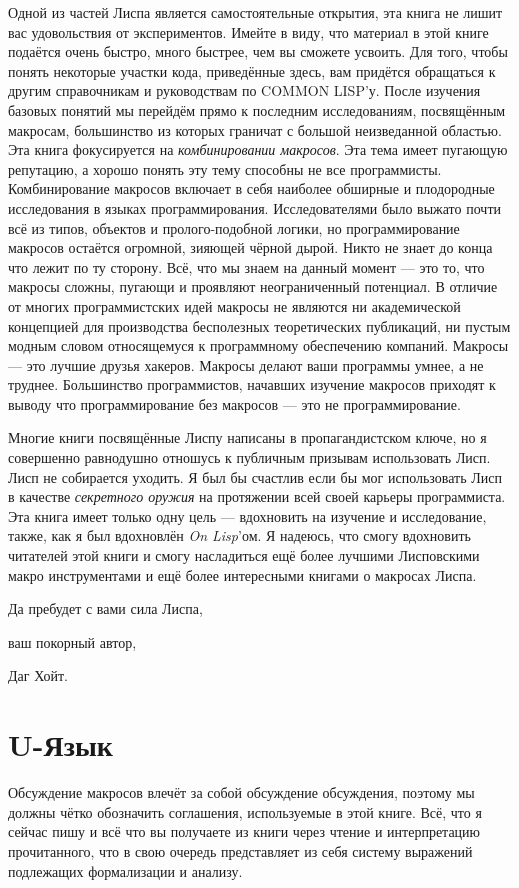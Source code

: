 Одной из частей Лиспа является самостоятельные открытия, эта кни\-га не лишит вас удовольствия от экспериментов. Имейте в виду, что материал в этой книге подаётся очень быстро, много быстрее, чем вы сможете усвоить. Для того, чтобы понять некоторые участки кода, приведённые здесь, вам придётся обращаться к другим справочникам и руководствам по COMMON LISP'у. После изучения базовых понятий мы перейдём прямо к последним исследованиям, посвящённым макросам, большинство из которых граничат с большой неизведанной областью. Эта книга фокусируется на \emph{комбинировании макросов}. Эта тема имеет пугающую репутацию, а хорошо понять эту тему способны не все прог\-рам\-мисты. Комбинирование макросов включает в себя наиболее об\-шир\-ные и плодородные исследования в языках программирования. Ис\-сле\-до\-ва\-те\-лями было выжато почти всё из типов, объектов и пролого-подобной логики, но программирование макросов остаётся огромной, зияющей чёрной дырой. Никто не знает до конца что лежит по ту сторону. Всё, что мы знаем на данный момент --- это то, что макросы сложны, пугающи и проявляют неограниченный потенциал. В отличие от многих программистских идей макросы не являются ни ака\-де\-ми\-ческой концепцией для производства бесполезных теоретических пуб\-ли\-каций, ни пустым модным словом относящемуся к программному обес\-пе\-че\-нию компаний. Макросы --- это лучшие друзья хакеров. Макросы делают ваши программы умнее, а не труднее. Большинство прог\-рам\-мис\-тов, начавших изучение макросов приходят к выводу что прог\-рам\-ми\-ро\-ва\-ние без макросов --- это не программирование.

Многие книги посвящённые Лиспу написаны в пропагандистском ключе, но я совершенно равнодушно отношусь к публичным призывам использовать Лисп. Лисп не собирается уходить. Я был бы счастлив если бы мог использовать Лисп в качестве \emph{секретного оружия} на про\-тя\-же\-нии всей своей карьеры программиста. Эта книга имеет только одну цель --- вдохновить на изучение и исследование, также, как я был вдохновлён \emph{On Lisp}'ом. Я надеюсь, что смогу вдохновить читателей этой книги и смогу насладиться ещё более лучшими Лисповскими макро инструментами и ещё более интересными книгами о макросах Лиспа.

Да пребудет с вами сила Лиспа,

ваш покорный автор,

Даг Хойт.
\section{U-Язык}\label{section_u_language}
Обсуждение макросов влечёт за собой обсуждение обсуждения, поэтому мы должны чётко обозначить соглашения, используемые в этой книге. Всё, что я сейчас пишу и всё что вы получаете из книги через чтение и интерпретацию прочитанного, что в свою очередь представляет из себя систему выражений подлежащих формализации и анализу.

